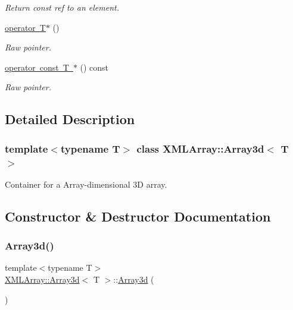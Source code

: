 \begin{DoxyCompactItemize}
\begin{DoxyCompactList}\small\item\em Return const ref to an element. \end{DoxyCompactList}\item 
\mbox{\hyperlink{classXMLArray_1_1Array3d_aec4e2efc011195e91a742b7fa33bbbdb}{operator T$\ast$}} ()
\begin{DoxyCompactList}\small\item\em Raw pointer. \end{DoxyCompactList}\item 
\mbox{\hyperlink{classXMLArray_1_1Array3d_a8eb9d716a0efb8d1ac737fcbef8dd50c}{operator const T $\ast$}} () const
\begin{DoxyCompactList}\small\item\em Raw pointer. \end{DoxyCompactList}\end{DoxyCompactItemize}


\subsection{Detailed Description}
\subsubsection*{template$<$typename T$>$\newline
class X\+M\+L\+Array\+::\+Array3d$<$ T $>$}

Container for a Array-\/dimensional 3D array. 

\subsection{Constructor \& Destructor Documentation}
\mbox{\label{classXMLArray_1_1Array3d_a05f33dbf6ca20ca7a16ec3e6d74f272b}} 
\subsubsection{\texorpdfstring{Array3d()}{Array3d()}\hspace{0.1cm}{\footnotesize\ttfamily [1/6]}}
{\footnotesize\ttfamily template$<$typename T$>$ \\
\mbox{\hyperlink{classXMLArray_1_1Array3d}{X\+M\+L\+Array\+::\+Array3d}}$<$ T $>$\+::\mbox{\hyperlink{classXMLArray_1_1Array3d}{Array3d}} (\begin{DoxyParamCaption}{ }\end{DoxyParamCaption})\hspace{0.3cm}{\ttfamily [inline]}}

